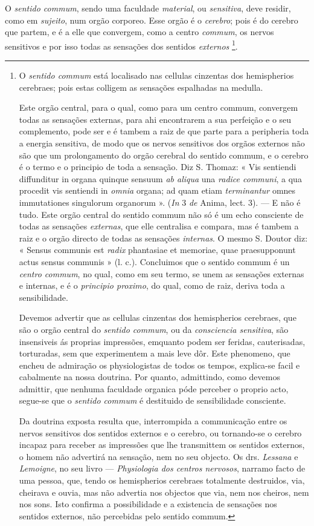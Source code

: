  
O \emph{sentido commum}, sendo uma faculdade \emph{material}, ou \emph{sensitiva}, deve residir, como em \emph{sujeito}, num orgão corporeo. Esse orgão é o \emph{cerebro}; pois é do cerebro que partem, e é a elle que convergem, como a centro \emph{commum}, os nervos sensitivos e por isso todas as sensações dos sentidos \emph{externos} \footnote{O \emph{sentido commum} está localisado nas cellulas cinzentas dos hemispherios cerebraes; pois estas colligem as sensações espalhadas na medulla.\par Este orgão central, para o qual, como para um centro commum, convergem todas as sensações externas, para ahi encontrarem a sua perfeição e o seu complemento, pode ser e é tambem a raiz de que parte para a peripheria toda a energia sensitiva, de modo que os nervos sensitivos dos orgãos externos não são que um prolongamento do orgão cerebral do sentido commum, e o cerebro é o termo e o principio de toda a sensação. Diz S. Thomaz: « Vis sentiendi diffunditur in organa quinque sensuum \emph{ab aliqua} una \emph{radice communi}, a qua procedit vis sentiendi in \emph{omnia} organa; ad quam etiam \emph{terminantur} omnes immutationes singulorum organorum ». (\emph{In} 3 \emph{de} Anima, lect. 3). --- E não é tudo. Este orgão central do sentido commum não só é um echo consciente de todas as sensações \emph{externas}, que elle centralisa e compara, mas é tambem a raiz e o orgão directo de todas as sensações \emph{internas}. O mesmo S. Doutor diz: « Sensus communis est \emph{radix} phantasiae et memoriae, quae praesupponunt actus sensus communis » (l. c.). Concluimos que o sentido commum é un \emph{centro commum}, no qual, como em seu termo, se unem as sensações externas e internas, e é o \emph{principio proximo}, do qual, como de raiz, deriva toda a sensibilidade.\par Devemos advertir que as cellulas cinzentas dos hemispherios cerebraes, que são o orgão central do \emph{sentido commum}, ou da \emph{consciencia sensitiva}, são insensiveis ás proprias impressões, emquanto podem ser feridas, cauterisadas, torturadas, sem que experimentem a mais leve dôr. Este phenomeno, que encheu de admiração os physiologistas de todos os tempos, explica-se facil e cabalmente na nossa doutrina. Por quanto, admittindo, como devemos admittir, que nenhuma faculdade organica póde perceber o proprio acto, segue-se que o \emph{sentido commum} é destituido de sensibilidade consciente.\par Da doutrina exposta resulta que, interrompida a communicação entre os nervos sensitivos dos sentidos externos e o cerebro, ou tornando-se o cerebro incapaz para receber as impressões que lhe transmittem os sentidos externos, o homem não advertirá na sensação, nem no seu objecto. Os drs. \emph{Lessana} e \emph{Lemoigne}, no seu livro --- \emph{Physiologia dos centros nervosos}, narramo facto de uma pessoa, que, tendo os hemispherios cerebraes totalmente destruidos, via, cheirava e ouvia, mas não advertia nos objectos que via, nem nos cheiros, nem nos sons. Isto confirma a possibilidade e a existencia de sensações nos sentidos externos, não percebidas pelo sentido commum.}.

